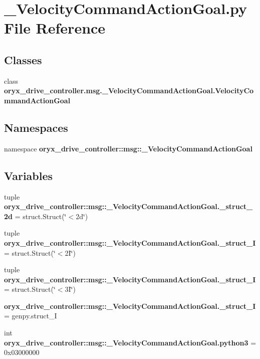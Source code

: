\section{\-\_\-\-Velocity\-Command\-Action\-Goal.\-py \-File \-Reference}
\label{__VelocityCommandActionGoal_8py}
\subsection*{\-Classes}
\begin{DoxyCompactItemize}
\item 
class {\bf oryx\-\_\-drive\-\_\-controller.\-msg.\-\_\-\-Velocity\-Command\-Action\-Goal.\-Velocity\-Command\-Action\-Goal}
\end{DoxyCompactItemize}
\subsection*{\-Namespaces}
\begin{DoxyCompactItemize}
\item 
namespace {\bf oryx\-\_\-drive\-\_\-controller\-::msg\-::\-\_\-\-Velocity\-Command\-Action\-Goal}
\end{DoxyCompactItemize}
\subsection*{\-Variables}
\begin{DoxyCompactItemize}
\item 
tuple {\bf oryx\-\_\-drive\-\_\-controller\-::msg\-::\-\_\-\-Velocity\-Command\-Action\-Goal.\-\_\-struct\-\_\-2d} = struct.\-Struct(\char`\"{}$<$2d\char`\"{})
\item 
tuple {\bf oryx\-\_\-drive\-\_\-controller\-::msg\-::\-\_\-\-Velocity\-Command\-Action\-Goal.\-\_\-struct\-\_\-I} = struct.\-Struct(\char`\"{}$<$2\-I\char`\"{})
\item 
tuple {\bf oryx\-\_\-drive\-\_\-controller\-::msg\-::\-\_\-\-Velocity\-Command\-Action\-Goal.\-\_\-struct\-\_\-I} = struct.\-Struct(\char`\"{}$<$3\-I\char`\"{})
\item 
{\bf oryx\-\_\-drive\-\_\-controller\-::msg\-::\-\_\-\-Velocity\-Command\-Action\-Goal.\-\_\-struct\-\_\-\-I} = genpy.\-struct\-\_\-\-I
\item 
int {\bf oryx\-\_\-drive\-\_\-controller\-::msg\-::\-\_\-\-Velocity\-Command\-Action\-Goal.\-python3} = 0x03000000
\end{DoxyCompactItemize}
